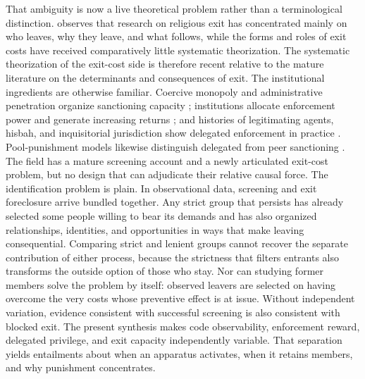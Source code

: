 \documentclass[12pt]{article}
\begin{document}
That ambiguity is now a live theoretical problem rather than a terminological distinction. \citet{bok2025} observes that research on religious exit has concentrated mainly on who leaves, why they leave, and what follows, while the forms and roles of exit costs have received comparatively little systematic theorization. The systematic theorization of the exit-cost side is therefore recent relative to the mature literature on the determinants and consequences of exit. The institutional ingredients are otherwise familiar. Coercive monopoly and administrative penetration organize sanctioning capacity \citep{weber1946,tilly1985,mann1986}; institutions allocate enforcement power and generate increasing returns \citep{north1990,greif2006,greif2016,pierson2000}; and histories of legitimating agents, hisbah, and inquisitorial jurisdiction show delegated enforcement in practice \citep{rubin2017,cook2000,given1997,kelly1989}. Pool-punishment models likewise distinguish delegated from peer sanctioning \citep{hilbe2014,sigmund2010}. The field has a mature screening account and a newly articulated exit-cost problem, but no design that can adjudicate their relative causal force. The identification problem is plain. In observational data, screening and exit foreclosure arrive bundled together. Any strict group that persists has already selected some people willing to bear its demands and has also organized relationships, identities, and opportunities in ways that make leaving consequential. Comparing strict and lenient groups cannot recover the separate contribution of either process, because the strictness that filters entrants also transforms the outside option of those who stay. Nor can studying former members solve the problem by itself: observed leavers are selected on having overcome the very costs whose preventive effect is at issue. Without independent variation, evidence consistent with successful screening is also consistent with blocked exit. The present synthesis makes code observability, enforcement reward, delegated privilege, and exit capacity independently variable. That separation yields entailments about when an apparatus activates, when it retains members, and why punishment concentrates.
\end{document}
